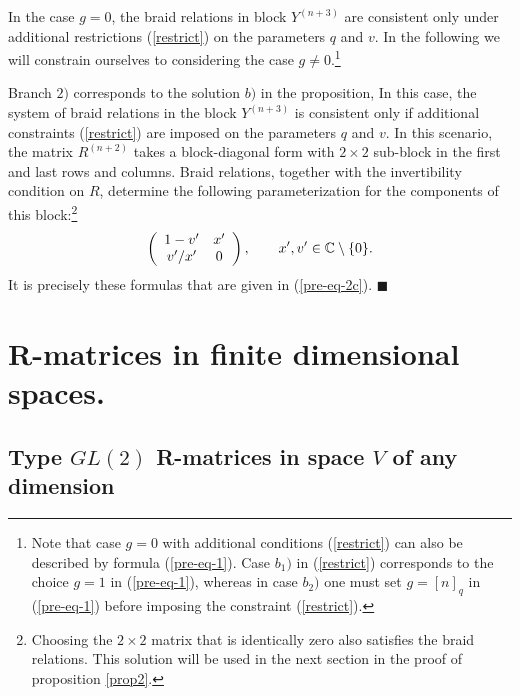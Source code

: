 \documentclass[11pt]{article}
\begin{document}
In the case $g=0$,  the braid relations in block $Y^{(n+3)}$ are consistent only under additional restrictions (\ref{restrict}) on the parameters $q$ and $v$.
In the following we will constrain ourselves to considering the case  $g\neq 0$.\footnote{Note that case $g=0$ with additional conditions (\ref{restrict}) can also be described by formula (\ref{pre-eq-1}). Case $b_1)$ in (\ref{restrict}) corresponds to the choice $g=1$ in (\ref{pre-eq-1}), whereas in case $b_2)$
one must set $g=[n]_q$ in (\ref{pre-eq-1}) before imposing the constraint (\ref{restrict}).}
\smallskip

Branch $2)$ corresponds to the solution $b)$ in the proposition, In this case, 
the system of braid relations in the block $Y^{(n+3)}$ is consistent only if additional constraints  (\ref{restrict})  are imposed on the parameters $q$ and $v$. In this scenario, the matrix $R^{(n+2)}$ takes a block-diagonal form with $2\times 2$ sub-block in the first and last rows and columns. 
Braid relations, together with the invertibility condition on $R$,  determine the following parameterization for the components of this block:\footnote{Choosing the $2 \times 2$ matrix that is identically zero also satisfies the braid relations. This solution will be used in the next section in the proof of proposition \ref{prop2}.}
$$
\left(
\begin{array}{cc}
	1-v' & x'
	\\
	v'/x' & 0
\end{array}
\right),  \qquad x', v' \in {\Bbb C}\setminus\{0\}.
$$
It is precisely these formulas that are given in (\ref{pre-eq-2c}).
\hfill$\blacksquare$\medskip



\section{R-matrices in finite dimensional spaces. }
\subsection{Type $GL(2)$ R-matrices  in space $V$ of any dimension} 
\end{document}
